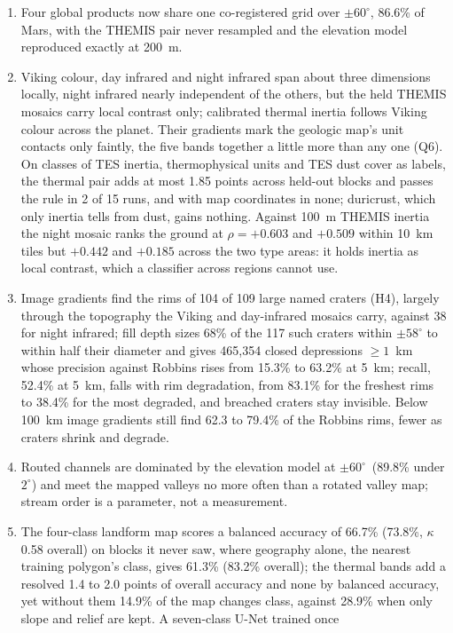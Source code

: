 \documentclass[twocolumn]{aastex701}
\newcommand{\pmsixty}{$\pm60^{\circ}$}
\newcommand{\kap}{$\kappa$}
\begin{document}
\begin{enumerate}
\item Four global products now share one co-registered grid over \pmsixty, 86.6\% of Mars, with the THEMIS pair never
resampled and the elevation model reproduced exactly at 200~m.
\item Viking colour, day infrared and night infrared span about three dimensions locally, night infrared nearly independent of the others, but the held THEMIS
mosaics carry local contrast only; calibrated thermal inertia follows Viking colour across the planet. Their gradients
mark the geologic map's unit contacts only faintly, the five bands together a little more than any one (Q6).
On classes of TES inertia, thermophysical units and TES dust cover as labels, the thermal pair adds at most 1.85
points across held-out blocks and passes the rule in 2 of 15 runs, and with map coordinates in none; duricrust,
which only inertia tells from dust, gains nothing. Against 100~m THEMIS inertia the night mosaic ranks the ground at
$\rho=+0.603$ and $+0.509$ within 10~km tiles but $+0.442$ and $+0.185$ across the two type areas: it holds inertia
as local contrast, which a classifier across regions cannot use.
\item Image gradients find the rims of 104 of 109 large named craters (H4), largely through the topography the
Viking and day-infrared mosaics carry, against 38 for night infrared; fill depth sizes 68\% of the 117 such craters within $\pm58^{\circ}$ to within half their diameter and gives 465,354 closed depressions $\ge1$~km whose precision
against Robbins rises from 15.3\% to 63.2\% at 5~km; recall, 52.4\% at 5~km, falls with rim degradation, from 83.1\%
for the freshest rims to 38.4\% for the most degraded, and breached craters stay invisible. Below 100~km image
gradients still find 62.3 to 79.4\% of the Robbins rims, fewer as craters shrink and degrade.
\item Routed channels are dominated by the elevation model at \pmsixty\ (89.8\% under $2^{\circ}$) and meet the mapped
valleys no more often than a rotated valley map; stream order is a parameter, not a measurement.
\item The four-class landform map scores a balanced accuracy of 66.7\% (73.8\%, \kap\,0.58 overall) on blocks it never
saw, where geography alone, the nearest training polygon's class, gives 61.3\% (83.2\% overall); the thermal bands add
a resolved 1.4 to 2.0 points of overall accuracy and none by balanced accuracy, yet without them 14.9\% of the map
changes class, against 28.9\% when only slope and relief are kept. A seven-class U-Net trained once

\end{enumerate}
\end{document}
